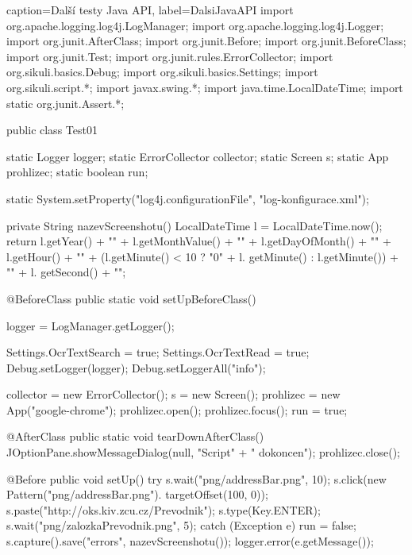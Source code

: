 	\begin{lstjava}{caption={Další testy Java API}, label={DalsiJavaAPI}}
import org.apache.logging.log4j.LogManager;
import org.apache.logging.log4j.Logger;
import org.junit.AfterClass;
import org.junit.Before;
import org.junit.BeforeClass;
import org.junit.Test;
import org.junit.rules.ErrorCollector;
import org.sikuli.basics.Debug;
import org.sikuli.basics.Settings;
import org.sikuli.script.*;
import javax.swing.*;
import java.time.LocalDateTime;
import static org.junit.Assert.*;

public class Test01 {

  static Logger logger;
  static ErrorCollector collector;
  static Screen s;
  static App prohlizec;
  static boolean run;

  static {
    System.setProperty("log4j.configurationFile",
      "log-konfigurace.xml");
  }

  private String nazevScreenshotu() {
    LocalDateTime l = LocalDateTime.now();
      return l.getYear() + "" + l.getMonthValue() +
        "" + l.getDayOfMonth() + "" + l.getHour() +
        "" + (l.getMinute() < 10 ? "0" + l.
        getMinute() : l.getMinute()) + "" + l.
        getSecond() + "";
  }

  @BeforeClass
  public static void setUpBeforeClass() {
    logger = LogManager.getLogger();

    Settings.OcrTextSearch = true;
    Settings.OcrTextRead = true;
    Debug.setLogger(logger);
    Debug.setLoggerAll("info");

    collector = new ErrorCollector();
    s = new Screen();
    prohlizec = new App("google-chrome");
    prohlizec.open();
    prohlizec.focus();
    run = true;
    }

  @AfterClass
  public static void tearDownAfterClass() {
    JOptionPane.showMessageDialog(null, "Script" +
      " dokoncen");
    prohlizec.close();
  }

  @Before
  public void setUp() {
    try {
      s.wait("png/addressBar.png", 10);
      s.click(new Pattern("png/addressBar.png").
        targetOffset(100, 0));
      s.paste("http://oks.kiv.zcu.cz/Prevodnik");
      s.type(Key.ENTER);
      s.wait("png/zalozkaPrevodnik.png", 5);
    } catch (Exception e) {
      run = false;
      s.capture().save("errors", nazevScreenshotu());
      logger.error(e.getMessage());
    }
  }

}
\end{lstjava}
